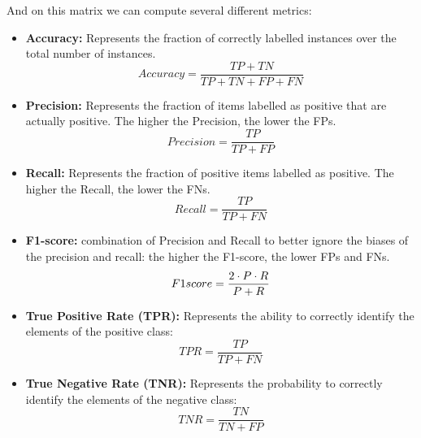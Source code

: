 And on this matrix we can compute several different metrics:
\begin{itemize}
    \item \textbf{Accuracy:} Represents the fraction of correctly labelled instances over the total number of instances.
    \begin{equation}
        Accuracy = \frac{TP + TN}{TP + TN + FP + FN}
    \end{equation}
    \item \textbf{Precision:} Represents the fraction of items labelled as positive that are actually positive. The higher the Precision, the lower the FPs.
    \begin{equation}
        Precision = \frac{TP}{TP + FP}
    \end{equation}
    \item \textbf{Recall:} Represents the fraction of positive items labelled as positive. The higher the Recall, the lower the FNs.
    \begin{equation}
        Recall = \frac{TP}{TP + FN}
    \end{equation}
    \item \textbf{F1-score:} combination of Precision and Recall to better ignore the biases of the precision and recall: the higher the F1-score, the lower FPs and FNs.
    \begin{equation}
        F1\-score = \frac{2 \cdot P \cdot R}{P + R}
    \end{equation}
    \item \textbf{True Positive Rate (TPR):} Represents the ability to correctly identify the elements of the positive class:
    \begin{equation}
    \label{eq:tpr}
        TPR = \frac{TP}{TP + FN}
    \end{equation}
    \item \textbf{True Negative Rate (TNR):} Represents the probability to correctly identify the elements of the negative class:
    \begin{equation}
    \label{eq:tnr}
        TNR = \frac{TN}{TN + FP}
    \end{equation}
\end{itemize}

